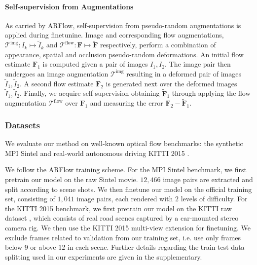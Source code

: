 \documentclass[10pt,twocolumn,letterpaper]{article}
\begin{document}
\paragraph{Self-supervision from Augmentations}
As carried by ARFlow, self-supervision from pseudo-random augmentations is applied during finetunine. Image and corresponding flow augmentations, $\mathcal{T}^{\text{img}}:I_k \mapsto \tilde{I}_k$ and $\mathcal{T}^{\text{flow}}: \mathbf{F \mapsto \tilde{F}}$ respectively, perform a combination of appearance, spatial and occlusion pseudo-random deformations. An initial flow estimate $\mathbf{F}_1$ is computed given a pair of images $I_1,I_2$. The image pair then undergoes an image augmentation $\mathcal{T}^{\text{img}}$ resulting in a deformed pair of images $\tilde{I}_1,\tilde{I}_2$. A second flow estimate $\mathbf{F}_2$ is generated next over the deformed images $\tilde{I}_1,\tilde{I}_2$. Finally, we acquire self-supervision obtaining $\mathbf{\tilde{F}}_1$ through applying the flow augmentation $\mathcal{T}^{\text{flow}}$ over $\mathbf{F}_1$ and measuring the error $\mathbf{F}_2-\mathbf{\tilde{F}}_1$.








\subsubsection{Datasets} \label{datasets}
We evaluate our method on well-known optical flow benchmarks: the synthetic MPI Sintel \cite{Butler:ECCV:2012} and real-world autonomous driving KITTI 2015 \cite{Menze2015CVPR}. 

We follow the ARFlow \cite{liu2020learning} training scheme. For the MPI Sintel benchmark, we first pretrain our model on the raw Sintel movie. $12,466$ image pairs are extracted and split according to scene shots. We then finetune our model on the official training set, consisting of $1,041$ image pairs, each rendered with $2$ levels of difficulty. 
For the KITTI 2015 benchmark, we first pretrain our model on the KITTI raw dataset \cite{Geiger2013IJRR}, which consists of real road scenes captured by a car-mounted stereo camera rig. 
We then use the KITTI 2015 multi-view extension for finetuning. We exclude frames related to validation from our training set, i.e. use only frames below 9 or above 12 in each scene. Further details regarding the train-test data splitting used in our experiments are given in the supplementary.
\end{document}
